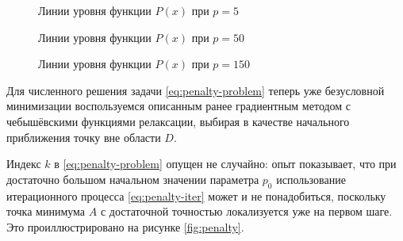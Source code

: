 \documentclass{article}
\theoremstyle{remark}
\theoremstyle{definition}
\numberwithin{equation}{section}
\begin{document}
\begin{figure}[!thb]
  \centering
  \caption{Линии уровня функции $P(x)$ при $p=5$}
    \label{fig:pen-contours2}
\end{figure}

\begin{figure}[!thb]
  \centering
  \caption{Линии уровня функции $P(x)$ при $p=50$}
  \label{fig:pen-contours3}
\end{figure}

\begin{figure}[!thb]
  \centering
  \caption{Линии уровня функции $P(x)$ при $p=150$}
  \label{fig:pen-contours4}
\end{figure}

Для численного решения задачи \eqref{eq:penalty-problem} теперь уже
безусловной минимизации воспользуемся описанным ранее градиентным
методом с чебышёвскими функциями релаксации, выбирая в качестве
начального приближения точку вне области $D$.

Индекс $k$ в \eqref{eq:penalty-problem} опущен не случайно: опыт
показывает, что при достаточно большом начальном значении параметра
$p_0$ использование итерационного процесса \eqref{eq:penalty-iter}
может и не понадобиться, поскольку точка минимума $A$ с достаточной
точностью локализуется уже на первом шаге. Это проиллюстрировано на
рисунке \ref{fig:penalty}.
\end{document}
